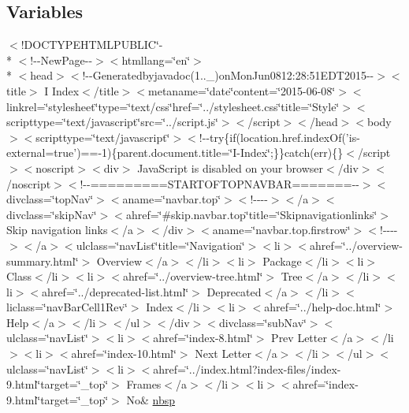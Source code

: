 \subsection*{Variables}
\begin{DoxyCompactItemize}
\item 
$<$!D\-O\-C\-T\-Y\-P\-E\-H\-T\-M\-L\-P\-U\-B\-L\-I\-C\char`\"{}-\/\\*
$<$!-\/-\/New\-Page-\/-\/$>$$<$htmllang=\char`\"{}en\char`\"{}$>$\\*
$<$head$>$$<$!-\/-\/Generatedbyjavadoc(1..\-\_)on\-Mon\-Jun0812\-:28\-:51\-E\-D\-T2015-\/-\/$>$$<$title$>$ I Index$<$/title$>$$<$metaname=\char`\"{}date\char`\"{}content=\char`\"{}2015-\/06-\/08\char`\"{}$>$$<$linkrel=\char`\"{}stylesheet\char`\"{}type=\char`\"{}text/css\char`\"{}href=\char`\"{}../stylesheet.\-css\char`\"{}title=\char`\"{}\-Style\char`\"{}$>$$<$scripttype=\char`\"{}text/javascript\char`\"{}src=\char`\"{}../script.\-js\char`\"{}$>$$<$/script$>$$<$/head$>$$<$body$>$$<$scripttype=\char`\"{}text/javascript\char`\"{}$>$$<$!-\/-\/try\{if(location.\-href.\-index\-Of('is-\/external=true')==-\/1)\{parent.\-document.\-title=\char`\"{}\-I-\/\-Index\char`\"{};\}\}catch(err)\{\}$<$/script$>$$<$noscript$>$$<$div$>$ Java\-Script is disabled on your browser$<$/div$>$$<$/noscript$>$$<$!-\/-\/=========\-S\-T\-A\-R\-T\-O\-F\-T\-O\-P\-N\-A\-V\-B\-A\-R=======-\/-\/$>$$<$divclass=\char`\"{}top\-Nav\char`\"{}$>$$<$aname=\char`\"{}navbar.\-top\char`\"{}$>$$<$!-\/-\/-\/-\/$>$$<$/a$>$$<$divclass=\char`\"{}skip\-Nav\char`\"{}$>$$<$ahref=\char`\"{}\#skip.\-navbar.\-top\char`\"{}title=\char`\"{}\-Skipnavigationlinks\char`\"{}$>$ Skip navigation links$<$/a$>$$<$/div$>$$<$aname=\char`\"{}navbar.\-top.\-firstrow\char`\"{}$>$$<$!-\/-\/-\/-\/$>$$<$/a$>$$<$ulclass=\char`\"{}nav\-List\char`\"{}title=\char`\"{}\-Navigation\char`\"{}$>$$<$li$>$$<$ahref=\char`\"{}../overview-\/summary.\-html\char`\"{}$>$ Overview$<$/a$>$$<$/li$>$$<$li$>$ Package$<$/li$>$$<$li$>$ Class$<$/li$>$$<$li$>$$<$ahref=\char`\"{}../overview-\/tree.\-html\char`\"{}$>$ Tree$<$/a$>$$<$/li$>$$<$li$>$$<$ahref=\char`\"{}../deprecated-\/list.\-html\char`\"{}$>$ Deprecated$<$/a$>$$<$/li$>$$<$liclass=\char`\"{}nav\-Bar\-Cell1\-Rev\char`\"{}$>$ Index$<$/li$>$$<$li$>$$<$ahref=\char`\"{}../help-\/doc.\-html\char`\"{}$>$ Help$<$/a$>$$<$/li$>$$<$/ul$>$$<$/div$>$$<$divclass=\char`\"{}sub\-Nav\char`\"{}$>$$<$ulclass=\char`\"{}nav\-List\char`\"{}$>$$<$li$>$$<$ahref=\char`\"{}index-\/8.\-html\char`\"{}$>$ Prev Letter$<$/a$>$$<$/li$>$$<$li$>$$<$ahref=\char`\"{}index-\/10.\-html\char`\"{}$>$ Next Letter$<$/a$>$$<$/li$>$$<$/ul$>$$<$ulclass=\char`\"{}nav\-List\char`\"{}$>$$<$li$>$$<$ahref=\char`\"{}../index.\-html?index-\/files/index-\/9.\-html\char`\"{}target=\char`\"{}\-\_\-top\char`\"{}$>$ Frames$<$/a$>$$<$/li$>$$<$li$>$$<$ahref=\char`\"{}index-\/9.\-html\char`\"{}target=\char`\"{}\-\_\-top\char`\"{}$>$ No\& \hyperlink{index-9_8html_a479d00f21dbca369efe3be97f1ef785a}{nbsp}
\end{DoxyCompactItemize}


